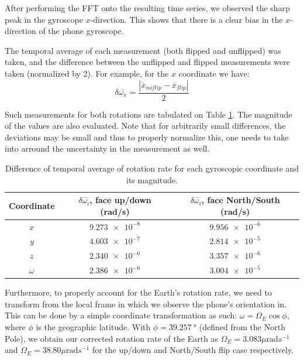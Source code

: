 \documentclass[a4paper]{article}
\begin{document}
After performing the FFT onto the resulting time series, we observed the sharp peak in the gyroscope $x$-direction.
This shows that there is a clear bias in the $x$-direction of the phone gyroscope. 

The temporal average of each measurement (both flipped and unflipped) was taken, and the difference between the unflipped and flipped
measurements were taken (normalized by 2). For example, for the $x$ coordinate we have: 
\begin{equation}
     \delta \bar{\omega_x} = \frac{|\bar{x}_{noflip} - \bar{x}_{flip}|}{2}
\end{equation}

Such measurements for both rotations are tabulated on Table \ref{tab:avg_rate_xyz}. The magnitude of the values are also evaluated.
Note that for arbitrarily small differences, the deviations may be small and thus to properly normalize this, one needs to take
into arround the uncertainty in the measurement as well. 

\begin{table}
\centering
\begin{tabular} {|c|c|c|}
 \hline
 Coordinate & $\delta \bar{\omega_i}$, face up/down (rad/s) & $\delta \bar{\omega_i}$, face North/South (rad/s) \\
 \hline
 $x$ & $\num{9.273e-8}$ & $\num{9.956e-6}$ \\
 \hline
 $y$  & $\num{4.603e-7}$ & $\num{2.814e-5}$ \\
 \hline
 $z$ & $\num{2.340e-6}$ & $\num{3.357e-6}$  \\
 \hline
 $\omega$ & $\num{2.386e-6}$ & $\num{3.004e-5}$ \\
 \hline
\end{tabular}
\caption{Difference of temporal average of rotation rate for each gyroscopic coordinate and its magnitude. }
\label{tab:avg_rate_xyz}
\end{table}
 
Furthermore, to properly account for the Earth's rotation rate, we need to transform from the local frame in which we observe the phone's orientation in.
This can be done by a simple coordinate transformation as such: $\omega = \Omega_E \cos\phi$, where $\phi$ is the geographic latitude.
With $\phi = \SI{39.257}{\degree}$ (defined from the North Pole), we obtain our corrected rotation rate of the Earth as 
$\Omega_E = 3.083\mu \text{rad}s^{-1}$ and $\Omega_E = 38.80\mu \text{rad}s^{-1}$ for the up/down and North/South
flip case respectively.  \par 
\end{document}
